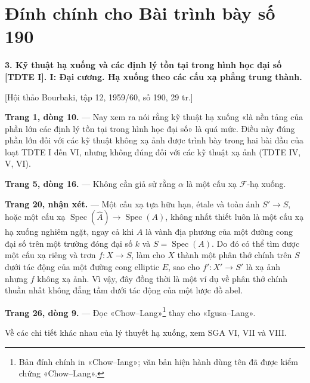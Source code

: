 \clearpage
\chapter*{Đính chính cho Bài trình bày số 190}
\setcounter{footnote}{0}

\noindent\textbf{3. Kỹ thuật hạ xuống và các định lý tồn tại trong hình học
đại số [TDTE I]. I: Đại cương. Hạ xuống theo các cấu xạ phẳng trung thành.}

\begin{center}
[Hội thảo Bourbaki, tập 12, 1959/60, số 190, 29 tr.]
\end{center}

\noindent\textbf{Trang 1, dòng 10.} --- Nay xem ra nói rằng kỹ thuật hạ xuống
«là nền tảng của phần lớn các định lý tồn tại trong hình học đại số» là quá
mức. Điều này đúng phần lớn đối với các kỹ thuật không xạ ảnh được trình bày
trong hai bài đầu của loạt TDTE I đến VI, nhưng không đúng đối với các kỹ
thuật xạ ảnh (TDTE IV, V, VI).

\noindent\textbf{Trang 5, dòng 16.} --- Không cần giả sử rằng $\alpha$ là một
cấu xạ $\mathcal F$-hạ xuống.

\noindent\textbf{Trang 20, nhận xét.} --- Một cấu xạ tựa hữu hạn, étale và
toàn ánh $S'\longrightarrow S$, hoặc một cấu xạ
$\operatorname{Spec}(\widehat A)\longrightarrow\operatorname{Spec}(A)$, không
nhất thiết luôn là một cấu xạ hạ xuống nghiêm ngặt, ngay cả khi $A$ là vành
địa phương của một đường cong đại số trên một trường đóng đại số $k$ và
$S=\operatorname{Spec}(A)$. Do đó có thể tìm được một cấu xạ riêng và trơn
$f:X\longrightarrow S$, làm cho $X$ thành
một phân thớ chính trên $S$ dưới tác động của một đường cong elliptic $E$,
sao cho $f':X'\longrightarrow S'$ là xạ ảnh nhưng $f$ không xạ ảnh. Vì vậy,
đây đồng thời là một ví dụ về phân thớ chính thuần nhất không đẳng tầm dưới
tác động của một lược đồ abel.

\noindent\textbf{Trang 26, dòng 9.} --- Đọc «Chow--Lang»\footnote{Bản đính
chính in «Chow--Iang»; văn bản hiện hành dùng tên đã được kiểm chứng
«Chow--Lang».} thay cho «Igusa--Lang».

Về các chi tiết khác nhau của lý thuyết hạ xuống, xem SGA VI, VII và VIII.

\par
